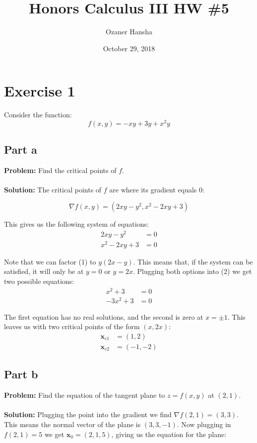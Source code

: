 \documentclass{article}
\begin{document}
\title{Honors Calculus III HW \#5}
\author{Ozaner Hansha}
\date{October 29, 2018}
\maketitle

\section*{Exercise 1}
Consider the function:
$$f(x,y)=-xy+3y+x^2y$$

\subsection*{Part a}
\textbf{Problem:} Find the critical points of $f$.
\\\\
\textbf{Solution:} The critical points of $f$ are where its gradient equals 0:

$$\nabla f(x,y)=(2xy-y^2,x^2-2xy+3)$$

This gives us the following system of equations:
\begin{align}
2xy-y^2&=0\\
x^2-2xy+3&=0
\end{align}

Note that we can factor (1) to $y(2x-y)$. This means that, if the system can be satisfied, it will only be at $y=0$ or $y=2x$. Plugging both options into (2) we get two possible equations:
\begin{align*}
x^2+3&=0\\
-3x^2+3&=0
\end{align*}

The first equation has no real solutions, and the second is zero at $x=\pm1$. This leaves us with two critical points of the form $(x,2x)$:
\begin{align*}
  \mathbf x_{c1}&=(1,2)\\
  \mathbf x_{c2}&=(-1,-2)
\end{align*}

\subsection*{Part b}
\textbf{Problem:} Find the equation of the tangent plane to $z=f(x,y)$ at $(2,1)$.
\\\\
\textbf{Solution:} Plugging the point into the gradient we find $\nabla f(2,1)=(3,3)$. This means the normal vector of the plane is $(3,3,-1)$. Now plugging in $f(2,1)=5$ we get $\mathbf x_0=(2,1,5)$, giving us the equation for the plane:
\end{document}
